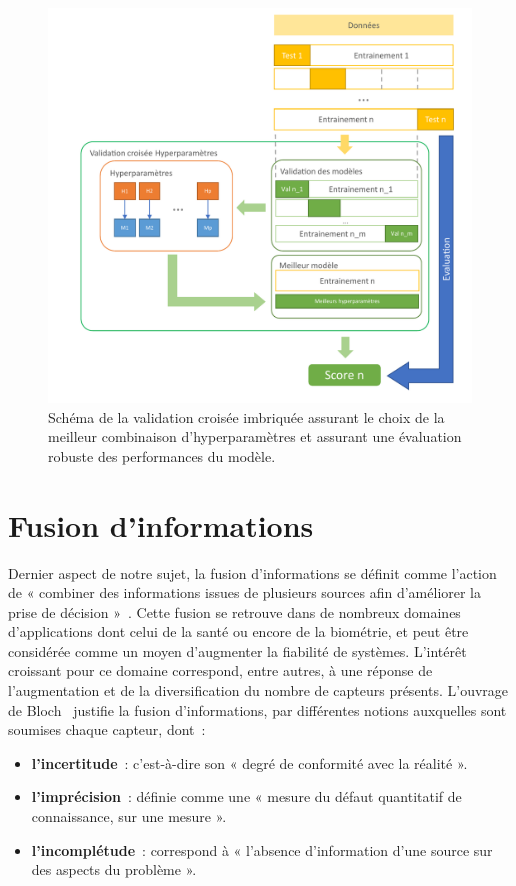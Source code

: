 \begin{figure}[H]
    \centering
    \includegraphics[width=0.9\linewidth]{contents/chapter_3/resources/scheme_hyperparameter_process.pdf}
    \caption{Schéma de la validation croisée imbriquée assurant le choix de la meilleur combinaison d'hyperparamètres et assurant une évaluation robuste des performances du modèle.}
    \label{fig:scheme_hyperparameter_process}
\end{figure}\par

\clearpage

\section{Fusion d’informations}
\label{sec:fusion_information}
Dernier aspect de notre sujet, la fusion d’informations se définit comme l’action de « combiner des informations issues de plusieurs sources afin d’améliorer la prise de décision »~\cite{Bloch2003}. Cette fusion se retrouve dans de nombreux domaines d'applications dont celui de la santé ou encore de la biométrie, et peut être considérée comme un moyen d'augmenter la fiabilité de systèmes. L'intérêt croissant pour ce domaine correspond, entre autres, à une réponse de l'augmentation et de la diversification du nombre de capteurs présents. L'ouvrage de Bloch~\cite{Bloch2003} justifie la fusion d'informations, par différentes notions auxquelles sont soumises chaque capteur, dont~:
\begin{itemize}
    \item \textbf{l'incertitude}~: c’est-à-dire son « degré de conformité avec la réalité ».
    \item \textbf{l'imprécision}~: définie comme une « mesure du défaut quantitatif de connaissance, sur une mesure ».
    \item \textbf{l'incomplétude}~: correspond à « l'absence d'information d'une source sur des aspects du problème ».
\end{itemize}\par

